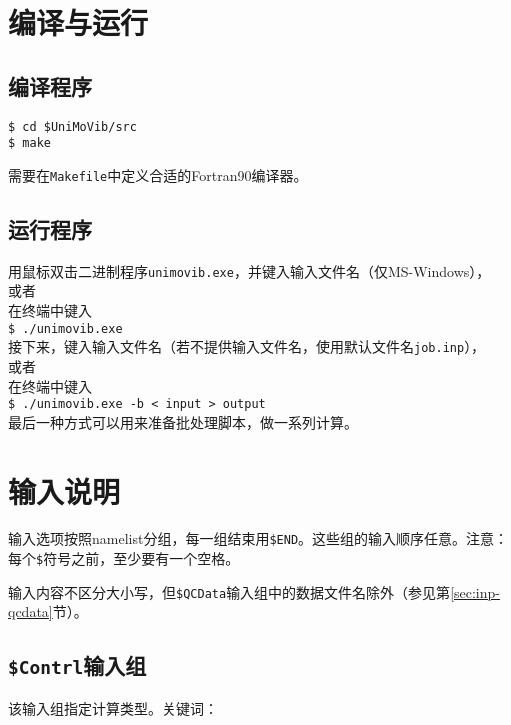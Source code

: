 \documentclass[12pt,a4paper,openany,twoside,cap]{ctexbook}
\begin{document}
\chapter{编译与运行} \label{part:setting}

\section{编译程序} \label{sec:install}

\noindent
\verb|$ cd $UniMoVib/src| \\
\verb|$ make |

需要在\verb|Makefile|中定义合适的Fortran90编译器。


\section{运行程序} \label{sec:run}

用鼠标双击二进制程序\verb|unimovib.exe|，并键入输入文件名（仅MS-Windows）， \\

或者 \\
在终端中键入 \\
\verb|$ ./unimovib.exe | \\
接下来，键入输入文件名（若不提供输入文件名，使用默认文件名\verb|job.inp|）， \\

或者 \\
在终端中键入 \\
\verb|$ ./unimovib.exe -b < input > output | \\

最后一种方式可以用来准备批处理脚本，做一系列计算。


\chapter{输入说明} \label{part:input}

输入选项按照namelist分组，每一组结束用\verb|$END|。这些组的输入顺序任意。注意：每个\verb|$|符号之前，至少要有一个空格。

输入内容不区分大小写，但\verb|$QCData|输入组中的数据文件名除外（参见第\ref{sec:inp-qcdata}节）。

\section{\texttt{\$Contrl}输入组} \label{sec:inp-contrl}

该输入组指定计算类型。关键词：
\end{document}
